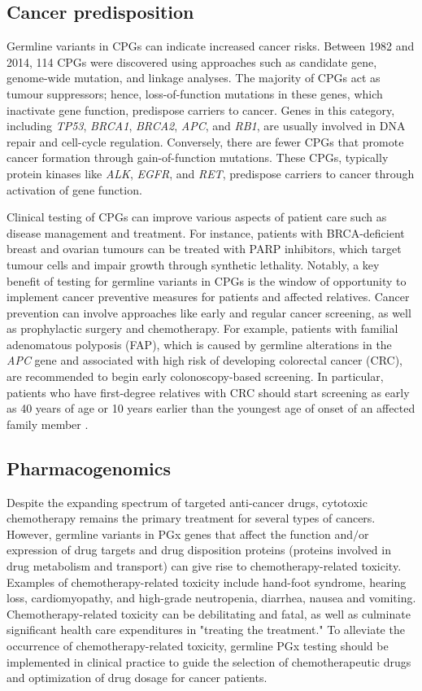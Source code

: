 \subsection{Cancer predisposition}

Germline variants in CPGs can indicate increased cancer risks. Between 1982 and 2014, 114 CPGs were discovered using approaches such as candidate gene, genome-wide mutation, and linkage analyses. The majority of CPGs act as tumour suppressors; hence, loss-of-function mutations in these genes, which inactivate gene function, predispose carriers to cancer. Genes in this category, including \textit{TP53}, \textit{BRCA1}, \textit{BRCA2}, \textit{APC}, and \textit{RB1}, are usually involved in DNA repair and cell-cycle regulation. Conversely, there are fewer CPGs that promote cancer formation through gain-of-function mutations. These CPGs, typically protein kinases like \textit{ALK}, \textit{EGFR}, and \textit{RET}, predispose carriers to cancer through activation of gene function.

Clinical testing of CPGs can improve various aspects of patient care such as disease management and treatment. For instance, patients with BRCA-deficient breast and ovarian tumours can be treated with PARP inhibitors, which target tumour cells and impair growth through synthetic lethality. Notably, a key benefit of testing for germline variants in CPGs is the window of opportunity to implement cancer preventive measures for patients and affected relatives. Cancer prevention can involve approaches like early and regular cancer screening, as well as prophylactic surgery and chemotherapy. For example, patients with familial adenomatous polyposis (FAP), which is caused by germline alterations in the \textit{APC} gene and associated with high risk of developing colorectal cancer (CRC), are recommended to begin early colonoscopy-based screening. In particular, patients who have first-degree relatives with CRC should start screening as early as 40 years of age or 10 years earlier than the youngest age of onset of an affected family member \cite{Blanco2015}.

\subsection{Pharmacogenomics}

Despite the expanding spectrum of targeted anti-cancer drugs, cytotoxic chemotherapy remains the primary treatment for several types of cancers. However, germline variants in PGx genes that affect the function and$/$or expression of drug targets and drug disposition proteins (proteins involved in drug metabolism and transport) can give rise to chemotherapy-related toxicity. Examples of chemotherapy-related toxicity include hand-foot syndrome, hearing loss, cardiomyopathy, and high-grade neutropenia, diarrhea, nausea and vomiting. Chemotherapy-related toxicity can be debilitating and fatal, as well as culminate significant health care expenditures in "treating the treatment." To alleviate the occurrence of chemotherapy-related toxicity, germline PGx testing should be implemented in clinical practice to guide the selection of chemotherapeutic drugs and optimization of drug dosage for cancer patients.

